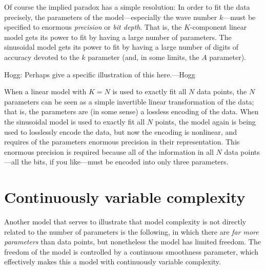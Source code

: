 \documentclass[12pt,twoside]{article}
\begin{document}
Of course the implied paradox has a simple resolution: In order to fit
the data precisely, the parameters of the model---especially the wave
number $k$---must be specified to enormous \emph{precision} or \emph{bit depth}.  That is,
the $K$-component linear model gets its power to fit by having a large
number of parameters.  The sinusoidal model gets its power to fit by
having a large number of digits of accuracy devoted to the $k$
parameter (and, in some limits, the $A$ parameter).

Hogg:  Perhaps give a specific illustration of this here.---Hogg

When a linear model with $K=N$ is used to exactly fit all $N$ data
points, the $N$ parameters can be seen as a simple invertible linear
transformation of the data; that is, the parameters are (in some
sense) a lossless encoding of the data.  When the sinusoidal model is
used to exactly fit all $N$ points, the model again is being used to
losslessly encode the data, but now the encoding is nonlinear, and
requires of the parameters enormous precision in their representation.
This enormous precision is required because all of the information in
all $N$ data points---all the bits, if you like---must be encoded into
only three parameters.

\section{Continuously variable complexity}

Another model that serves to illustrate that model complexity is not
directly related to the number of parameters is the following, in
which there are \emph{far more parameters} than data points, but
nonetheless the model has limited freedom.  The freedom of the model
is controlled by a continuous smoothness parameter, which effectively
makes this a model with continuously variable complexity.
\end{document}
